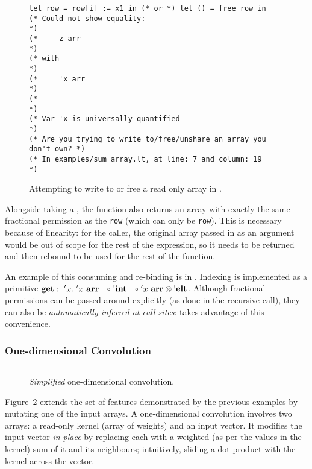 \begin{figure}[t]
    \centering
    \begin{verbatim}
let row = row[i] := x1 in (* or *) let () = free row in
(* Could not show equality:                                        *)
(*     z arr                                                       *)
(* with                                                            *)
(*     'x arr                                                      *)
(*                                                                 *)
(* Var 'x is universally quantified                                *)
(* Are you trying to write to/free/unshare an array you don't own? *)
(* In examples/sum_array.lt, at line: 7 and column: 19             *)
    \end{verbatim}
    \caption{Attempting to write to or free a read only array in
    \lang.}\label{fig:lang_errormsg}
\end{figure}

Alongside taking a , the function also returns an array
with exactly the same fractional permission as the \texttt{row} (which can only
be \texttt{row}).  This is necessary because of linearity: for the caller, the
original array passed in as an argument would be out of scope for the rest of
the expression, so it needs to be returned and then rebound to be used for the
rest of the function.

An example of this consuming and re-binding is in . Indexing is implemented as a primitive $\ottkw{get}:\ {'x}.\ {{'x}\
\Arr} \multimap {!\Int} \multimap {'x\ \Arr} \otimes {!\Elt}$.
Although fractional permissions can be passed around explicitly  (as done in
the recursive call), they can also be \emph{automatically inferred at call
sites}: \highl{row[i] == get _ row i} takes advantage of this convenience.

\subsubsection{One-dimensional Convolution}

\begin{figure}[t]
    \centering
    \inputminted[fontsize=\small]{ocaml}{../../examples/weighted_avg_infer.lt}
    \caption{\emph{Simplified} one-dimensional convolution.}\label{fig:lang_oned_conv}
\end{figure}

Figure~\ref{fig:lang_oned_conv} extends the set of features demonstrated by the
previous examples by mutating one of the input arrays. A one-dimensional
convolution involves two arrays: a read-only kernel (array of weights) and an
input vector. It modifies the input vector \emph{in-place} by replacing each
\highl{write[i]} with a weighted (as per the values in the kernel) sum of it
and its neighbours; intuitively, sliding a dot-product with the kernel across
the vector.

